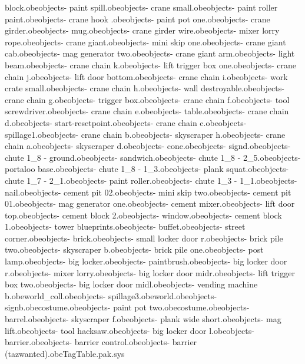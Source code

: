 block.obe objects\bank - paint spill.obe objects\bank - crane small.obe objects\bank - paint roller paint.obe objects\bank - crane hook .obe objects\bank - paint pot one.obe objects\bank - crane girder.obe objects\bank - mug.obe objects\bank - crane girder wire.obe objects\bank - mixer lorry rope.obe objects\bank - crane giant.obe objects\bank - mini skip one.obe objects\bank - crane giant cab.obe objects\bank - mag generator two.obe objects\bank - crane giant arm.obe objects\bank - light beam.obe objects\bank - crane chain k.obe objects\bank - lift trigger box one.obe objects\bank - crane chain j.obe objects\bank - lift door bottom.obe objects\bank - crane chain i.obe objects\bank - work crate small.obe objects\bank - crane chain h.obe objects\bank - wall destroyable.obe objects\bank - crane chain g.obe objects\bank - trigger box.obe objects\bank - crane chain f.obe objects\bank - tool screwdriver.obe objects\bank - crane chain e.obe objects\bank - table.obe objects\bank - crane chain d.obe objects\bank - start-resetpoint.obe objects\bank - crane chain c.obe objects\bank - spillage1.obe objects\bank - crane chain b.obe objects\bank - skyscraper h.obe objects\bank - crane chain a.obe objects\bank - skyscraper d.obe objects\bank - cone.obe objects\bank - signd.obe objects\bank - chute 1_8 - ground.obe objects\bank - sandwich.obe objects\bank - chute 1_8 - 2_5.obe objects\bank - portaloo base.obe objects\bank - chute 1_8 - 1_3.obe objects\bank - plank squat.obe objects\bank - chute 1_7 - 2_1.obe objects\bank - paint roller.obe objects\bank - chute 1_3 - 1_1.obe objects\bank - nail.obe objects\bank - cement pit 02.obe objects\bank - mini skip two.obe objects\bank - cement pit 01.obe objects\bank - mag generator one.obe objects\bank - cement mixer.obe objects\bank - lift door top.obe objects\bank - cement block 2.obe objects\bank - window.obe objects\bank - cement block 1.obe objects\bank - tower blueprints.obe objects\bank - buffet.obe objects\bank - street corner.obe objects\bank - brick.obe objects\bank - small locker door r.obe objects\bank - brick pile two.obe objects\bank - skyscraper b.obe objects\bank - brick pile one.obe objects\bank - post lamp.obe objects\bank - big locker.obe objects\bank - paintbrush.obe objects\bank - big locker door r.obe objects\bank - mixer lorry.obe objects\bank - big locker door midr.obe objects\bank - lift trigger box two.obe objects\bank - big locker door midl.obe objects\bank - vending machine b.obe world_coll.obe objects\bank - spillage3.obe world.obe objects\bank - signb.obe costume\constructionhat.obe objects\bank - paint pot two.obe costume\constructionbelt.obe objects\bank - barrel.obe objects\bank - skyscraper f.obe objects\bank - plank wide short.obe objects\bank - mag lift.obe objects\bank - tool hacksaw.obe objects\bank - big locker door l.obe objects\bank - barrier.obe objects\bank - barrier control.obe objects\bank - barrier (tazwanted).obe TagTable.pak.sys 